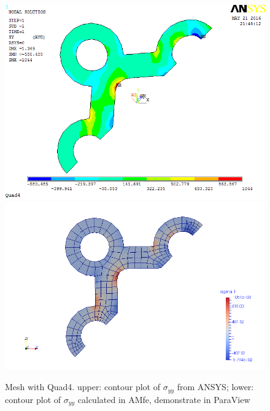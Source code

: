 \begin{figure}[htbp]
	\begin{center}
		\includegraphics[width=13cm,clip]{Quad4_Syy.png} 		
		\includegraphics[width=13cm,clip]{Quad4_Syy_P.png} 		
		\caption{Mesh with Quad4. upper: contour plot of $\sigma_{yy}$ from ANSYS; lower: contour plot of $\sigma_{yy}$ calculated in AMfe, demonstrate in ParaView} \label{fig: Quad4_Syy}
	\end{center}
\end{figure}
\clearpage 

